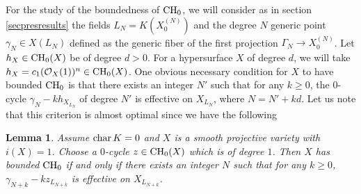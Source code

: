 \documentclass[10pt]{article}
\newtheorem{lemm}[theo]{Lemma}
\begin{document}
For the study of the boundedness of ${\rm CH}_0$, we will consider as in section  \ref{secpresresults} the fields $L_N=K(X^{(N)}_0)$ and the degree $N$  generic point $\gamma_N\in X(L_N) $ defined as the generic fiber of the first projection $\Gamma_N\rightarrow X^{(N)}_0$. Let $h_X\in {\rm CH}_0(X)$ be of degree $d>0$. For  a  hypersurface $X$ of degree $d$, we will take $h_X=c_1(\mathcal{O}_X(1))^n\in {\rm CH}_0(X)$.  One obvious necessary condition for $X$ to have bounded ${\rm CH}_0$ is that there exists an integer $N'$ such that for any $k\geq 0$, the $0$-cycle $\gamma_{N}-k h_{X_{L_{N}}}$ of degree $N'$ is effective on $X_{L_{N}}$, where $N=N'+kd$.  Let us note that this  criterion   is almost  optimal since we have the following
\begin{lemm}\label{lemmanew16juillet}  Assume ${\rm char}\,K=0$ and $X$ is a  smooth projective variety with  $i(X)=1$. Choose  a $0$-cycle  $z\in{\rm CH}_0(X)$ which is of degree $1$.  Then $X$ has bounded ${\rm CH}_0$ if and only if there exists an integer $N$ such that for any $k\geq 0$, $\gamma_{N+k}-k z_{L_{N+k}}$ is effective on $X_{L_{N+k}}$.
\end{lemm}
\end{document}

